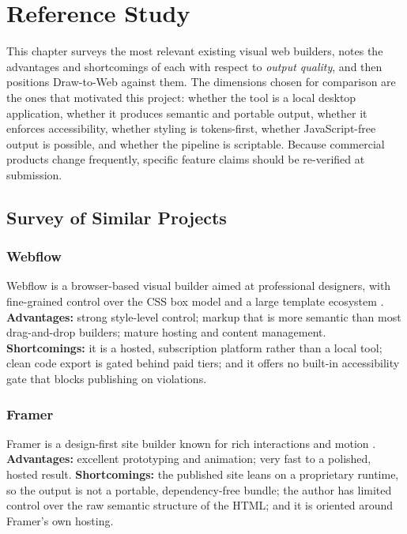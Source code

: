 
\chapter{Reference Study}
\label{ch:refstudy}

This chapter surveys the most relevant existing visual web builders, notes the
advantages and shortcomings of each with respect to \emph{output quality}, and then
positions Draw-to-Web against them. The dimensions chosen for comparison are the
ones that motivated this project: whether the tool is a local desktop application,
whether it produces semantic and portable output, whether it enforces
accessibility, whether styling is tokens-first, whether JavaScript-free output is
possible, and whether the pipeline is scriptable. Because commercial products
change frequently, specific feature claims should be re-verified at submission.

\section{Survey of Similar Projects}

\subsection{Webflow}
Webflow is a browser-based visual builder aimed at professional designers, with
fine-grained control over the CSS box model and a large template ecosystem
\cite{webflow}. \textbf{Advantages:} strong style-level control; markup that is
more semantic than most drag-and-drop builders; mature hosting and content
management. \textbf{Shortcomings:} it is a hosted, subscription platform rather
than a local tool; clean code export is gated behind paid tiers; and it offers no
built-in accessibility gate that blocks publishing on violations.

\subsection{Framer}
Framer is a design-first site builder known for rich interactions and motion
\cite{framer}. \textbf{Advantages:} excellent prototyping and animation; very fast
to a polished, hosted result. \textbf{Shortcomings:} the published site leans on a
proprietary runtime, so the output is not a portable, dependency-free bundle; the
author has limited control over the raw semantic structure of the HTML; and it is
oriented around Framer's own hosting.

